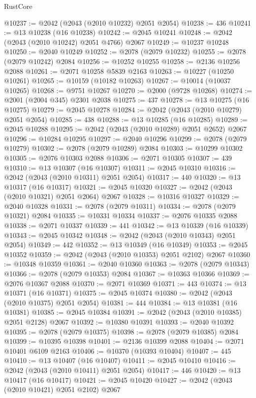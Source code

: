 \begin{lexlean}{RustCore}
\begin{coremodule}
@10237 := @2042 (@2043 (@2010 @10232) @2051 @2054)
@10238 := 436
@10241 := @13 @10238 (@16 @10238)
@10242 := @2045 @10241
@10248 := @2042 (@2043 (@2010 @10242) @2051 @4766) @2067
@10249 := @10237 @10248
@10250 := @2040 @10249
@10252 := @2078 (@2079 @10232)
@10255 := @2078 (@2079 @10242) @2084
@10256 := @10252 @10255
@10258 := @2136 @10256 @2088
@10261 := @2071 @10258 @5839 @2163
@10263 := @10227 (@10250 @10261)
@10265 := @10159 (@10182 @10263)
@10267 := @10014 (@10037 @10265)
@10268 := @9751 @10267
@10270 := @2000 (@9728 @10268)
@10274 := @2001 (@2004 @345) @2301 @2038
@10275 := 437
@10278 := @13 @10275 (@16 @10275)
@10279 := @2045 @10278
@10284 := @2042 (@2043 (@2010 @10279) @2051 @2054)
@10285 := 438
@10288 := @13 @10285 (@16 @10285)
@10289 := @2045 @10288
@10295 := @2042 (@2043 (@2010 @10289) @2051 @2652) @2067
@10296 := @10284 @10295
@10297 := @2040 @10296
@10299 := @2078 (@2079 @10279)
@10302 := @2078 (@2079 @10289) @2084
@10303 := @10299 @10302
@10305 := @2076 @10303 @2088
@10306 := @2071 @10305
@10307 := 439
@10310 := @13 @10307 (@16 @10307)
@10311 := @2045 @10310
@10316 := @2042 (@2043 (@2010 @10311) @2051 @2054)
@10317 := 440
@10320 := @13 @10317 (@16 @10317)
@10321 := @2045 @10320
@10327 := @2042 (@2043 (@2010 @10321) @2051 @2064) @2067
@10328 := @10316 @10327
@10329 := @2040 @10328
@10331 := @2078 (@2079 @10311)
@10334 := @2078 (@2079 @10321) @2084
@10335 := @10331 @10334
@10337 := @2076 @10335 @2088
@10338 := @2071 @10337
@10339 := 441
@10342 := @13 @10339 (@16 @10339)
@10343 := @2045 @10342
@10348 := @2042 (@2043 (@2010 @10343) @2051 @2054)
@10349 := 442
@10352 := @13 @10349 (@16 @10349)
@10353 := @2045 @10352
@10359 := @2042 (@2043 (@2010 @10353) @2051 @2102) @2067
@10360 := @10348 @10359
@10361 := @2040 @10360
@10363 := @2078 (@2079 @10343)
@10366 := @2078 (@2079 @10353) @2084
@10367 := @10363 @10366
@10369 := @2076 @10367 @2088
@10370 := @2071 @10369
@10371 := 443
@10374 := @13 @10371 (@16 @10371)
@10375 := @2045 @10374
@10380 := @2042 (@2043 (@2010 @10375) @2051 @2054)
@10381 := 444
@10384 := @13 @10381 (@16 @10381)
@10385 := @2045 @10384
@10391 := @2042 (@2043 (@2010 @10385) @2051 @2128) @2067
@10392 := @10380 @10391
@10393 := @2040 @10392
@10395 := @2078 (@2079 @10375)
@10398 := @2078 (@2079 @10385) @2084
@10399 := @10395 @10398
@10401 := @2136 @10399 @2088
@10404 := @2071 @10401 @6109 @2163
@10406 := @10370 (@10393 @10404)
@10407 := 445
@10410 := @13 @10407 (@16 @10407)
@10411 := @2045 @10410
@10416 := @2042 (@2043 (@2010 @10411) @2051 @2054)
@10417 := 446
@10420 := @13 @10417 (@16 @10417)
@10421 := @2045 @10420
@10427 := @2042 (@2043 (@2010 @10421) @2051 @2102) @2067

\end{coremodule}
\end{lexlean}
